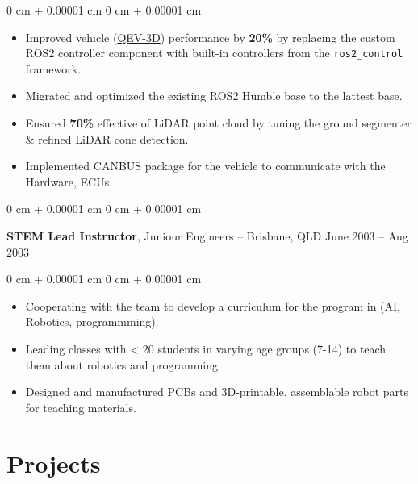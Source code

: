\documentclass[10pt, letterpaper]{article}
\newenvironment{highlights}{
    \begin{itemize}[
        topsep=0.10 cm,
        parsep=0.10 cm,
        partopsep=0pt,
        itemsep=0pt,
        leftmargin=0 cm + 10pt
    ]
}{
    \end{itemize}
} %
\newenvironment{onecolentry}{
    \begin{adjustwidth}{
        0 cm + 0.00001 cm
    }{
        0 cm + 0.00001 cm
    }
}{
    \end{adjustwidth}
} %
\newenvironment{twocolentry}[2][]{
    \onecolentry
    \def\secondColumn{#2}
    \setcolumnwidth{\fill, 4.5 cm}
    \begin{paracol}{2}
}{
    \switchcolumn \raggedleft \secondColumn
    \end{paracol}
    \endonecolentry
} %
\begin{document}
\vspace{0.10 cm}
\begin{onecolentry}

      \begin{highlights}
            \item Improved vehicle (\href{https://qutmotorsport.com/qev-3d/}{QEV-3D}) performance
            by \textbf{20\%} by replacing the custom ROS2 controller component with
            built-in controllers from the \texttt{ros2\_control} framework.
            \item Migrated and optimized the existing ROS2 Humble base to the lattest base.
            \item Ensured \textbf{70\%} effective of LiDAR point cloud by tuning the ground
            segmenter \& refined LiDAR cone detection.
            \item Implemented CANBUS package for the vehicle to communicate with the Hardware, ECUs.

      \end{highlights}
\end{onecolentry}

\vspace{0.4 cm}

\begin{twocolentry}{
            June 2003 – Aug 2003
      }
      \textbf{STEM Lead Instructor}, Juniour Engineers -- Brisbane, QLD\end{twocolentry}

\vspace{0.10 cm}
\begin{onecolentry}
      \begin{highlights}
            \item Cooperating with the team to develop a curriculum for the program in (AI,
            Robotics, programmming).
            \item Leading classes with < 20 students in varying age groups (7-14) to teach them
            about robotics and programming
            \item Designed and manufactured PCBs and 3D-printable, 
            assemblable robot parts for teaching materials.
      \end{highlights}
\end{onecolentry}

\section{Projects}
\end{document}
